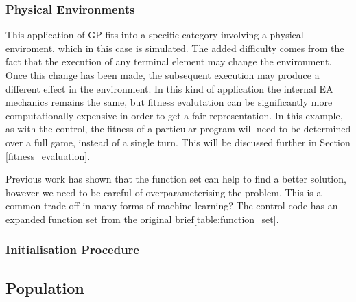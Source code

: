 \documentclass{article}
\begin{document}
\subsubsection{Physical Environments}
This application of GP fits into a specific category involving a physical enviroment, which in this case is simulated. The added difficulty comes from the fact that the execution of any terminal element may change the environment. Once this change has been made, the subsequent execution may produce a different effect in the environment. In this kind of application the internal EA mechanics remains the same, but fitness evalutation can be significantly more computationally expensive\cite[p. 110]{textbook} in order to get a fair representation. In this example, as with the control, the fitness of a particular program will need to be determined over a full game, instead of a single turn. This will be discussed further in Section \ref{fitness_evaluation}.

Previous work has shown that the function set can help to find a better solution, however we need to be careful of overparameterising the problem.%
This is a common trade-off in many forms of machine learning?
The control code has an expanded function set from the original brief\ref{table:function_set}.

\subsubsection{Initialisation Procedure}

\subsection{Population}
\end{document}
